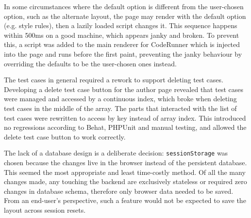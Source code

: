 In some circumstances where the default option is different from the user-chosen option, such as the alternate layout, the page may render with the default option (e.g. style rules), then a lazily loaded script changes it. This sequence happens within 500ms on a good machine, which appears janky and broken. To prevent this, a script was added to the main renderer for CodeRunner which is injected into the page and runs before the first paint, preventing the janky behaviour by overriding the defaults to be the user-chosen ones instead.

The test cases in general required a rework to support deleting test cases. Developing a delete test case button for the author page revealed that test cases were managed and accessed by a continuous index, which broke when deleting test cases in the middle of the array. The parts that interacted with the list of test cases were rewritten to access by key instead of array index. This introduced no regressions according to Behat, PHPUnit and manual testing, and allowed the delete test case button to work correctly.

The lack of a database design is a deliberate decision: \texttt{sessionStorage} was chosen because the changes live in the browser instead of the persistent database. This seemed the most appropriate and least time-costly method. Of all the many changes made, any touching the backend are exclusively stateless or required zero changes in database schema, therefore only browser data needed to be saved. From an end-user's perspective, such a feature would not be expected to save the layout across session resets.

